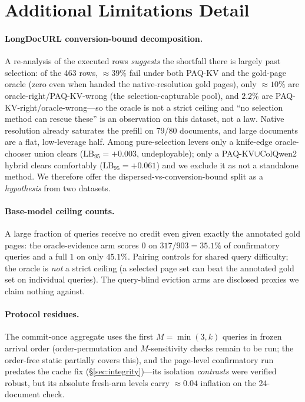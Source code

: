 \documentclass[letterpaper]{article} %
\newcommand{\paqc}{\textsc{PAQ-KV}}
\newcommand{\lb}{\mathrm{LB}_{95}}
\begin{document}
\section{Additional Limitations Detail}\label{app:limitations-detail}
\paragraph{LongDocURL conversion-bound decomposition.} A re-analysis of the executed rows \emph{suggests} the shortfall there is largely past selection: of the 463 rows, ${\approx}39\%$ fail under both \paqc{} and the gold-page oracle (zero even when handed the native-resolution gold pages), only ${\approx}10\%$ are oracle-right/\paqc{}-wrong (the selection-capturable pool), and $2.2\%$ are \paqc{}-right/oracle-wrong---so the oracle is not a strict ceiling and ``no selection method can rescue these'' is an observation on this dataset, not a law. Native resolution already saturates the prefill on 79/80 documents, and large documents are a flat, low-leverage half. Among pure-selection levers only a knife-edge oracle-chooser union clears ($\lb=+0.003$, undeployable); only a \paqc{}${\cup}$ColQwen2 hybrid clears comfortably ($\lb=+0.061$) and we exclude it as not a standalone method. We therefore offer the dispersed-vs-conversion-bound split as a \emph{hypothesis} from two datasets.

\paragraph{Base-model ceiling counts.} A large fraction of queries receive no credit even given exactly the annotated gold pages: the oracle-evidence arm scores $0$ on $317/903=35.1\%$ of confirmatory queries and a full $1$ on only $45.1\%$. Pairing controls for shared query difficulty; the oracle is \emph{not} a strict ceiling (a selected page set can beat the annotated gold set on individual queries). The query-blind eviction arms are disclosed proxies we claim nothing against.

\paragraph{Protocol residues.} The commit-once aggregate uses the first $M{=}\min(3,k)$ queries in frozen arrival order (order-permutation and $M$-sensitivity checks remain to be run; the order-free static partially covers this), and the page-level confirmatory run predates the cache fix (\S\ref{sec:integrity})---its isolation \emph{contrasts} were verified robust, but its absolute fresh-arm levels carry ${\approx}0.04$ inflation on the 24-document check.
\end{document}
